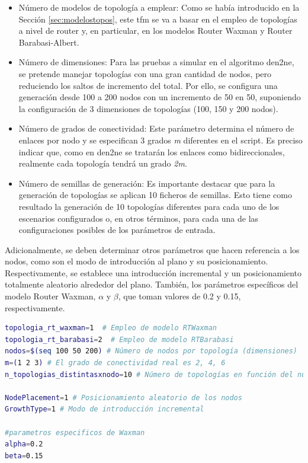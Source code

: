 \begin{itemize}
    \item Número de modelos de topología a emplear: Como se había introducido en la Sección \ref{sec:modelostopos}, este \gls{tfm} se va a basar en el empleo de topologías a nivel de router y, en particular, en los modelos Router Waxman y Router Barabasi-Albert. 
    \item Número de dimensiones: Para las pruebas a simular en el algoritmo \gls{den2ne}, se pretende manejar topologías con una gran cantidad de nodos, pero reduciendo los saltos de incremento del total. Por ello, se configura una generación desde 100 a 200 nodos con un incremento de 50 en 50, suponiendo la configuración de 3 dimensiones de topologías (100, 150 y 200 nodos). 
    \item Número de grados de conectividad: Este parámetro determina el número de enlaces por nodo y se especifican 3 grados \textit{m} diferentes en el script. Es preciso indicar que, como en \gls{den2ne} se tratarán los enlaces como bidireccionales, realmente cada topología tendrá un grado \textit{2m}.
    \item Número de semillas de generación: Es importante destacar que para la generación de topologías se aplican 10 ficheros de semillas. Esto tiene como resultado la generación de 10 topologías diferentes para cada uno de los escenarios configurados o, en otros términos, para cada una de las configuraciones posibles de los parámetros de entrada.
\end{itemize}

\vspace{3mm}

Adicionalmente, se deben determinar otros parámetros que hacen referencia a los nodos, como son el modo de introducción al plano y su posicionamiento. Respectivamente, se establece una introducción incremental y un posicionamiento totalmente aleatorio alrededor del plano. También, los parámetros específicos del modelo Router Waxman, $\alpha$ y $\beta$, que toman valores de 0.2 y 0.15, respectivamente.

\vspace{3mm}

\begin{lstlisting}[language=bash, style=Consola, caption={Configuración de los parámetros de entrada en el script de automatización de \acrshort{brite}}]
topologia_rt_waxman=1  # Empleo de modelo RTWaxman
topologia_rt_barabasi=2  # Empleo de modelo RTBarabasi
nodos=$(seq 100 50 200) # Número de nodos por topología (dimensiones)
m=(1 2 3) # El grado de conectividad real es 2, 4, 6
n_topologias_distintasxnodo=10 # Número de topologías en función del número de semillas

NodePlacement=1 # Posicionamiento aleatorio de los nodos
GrowthType=1 # Modo de introducción incremental

#parametros especificos de Waxman
alpha=0.2
beta=0.15
\end{lstlisting}

